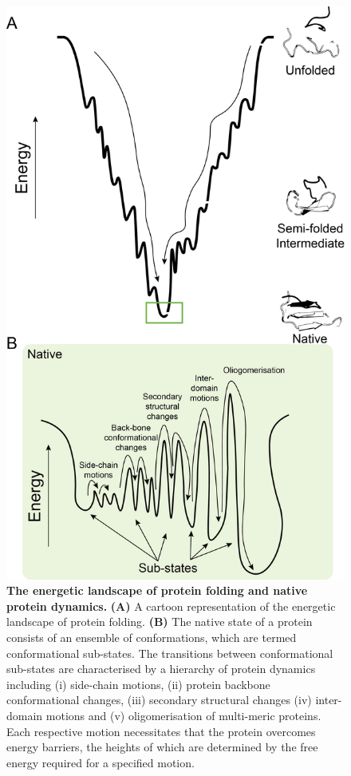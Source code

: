 \begin{figure}[!ht]
\includegraphics[scale=0.6]{conformational_landscape.png}
\caption[The energetic landscape of protein folding and native protein dynamics.]{\textbf{The energetic landscape of protein folding and native protein dynamics.} \textbf{(A)} A cartoon representation of the energetic landscape of protein folding. \textbf{(B)} The native state of a protein consists of an ensemble of conformations, which are termed conformational sub-states. The transitions between conformational sub-states are characterised by a hierarchy of protein dynamics including (i) side-chain motions, (ii) protein backbone conformational changes, (iii) secondary structural changes (iv) inter-domain motions and (v) oligomerisation of multi-meric proteins. Each respective motion necessitates that the protein overcomes energy barriers, the heights of which are determined by the free energy required for a specified motion.}
\label{fig:protein_dynamic_landscape}
\end{figure}

